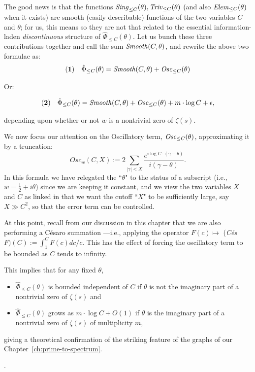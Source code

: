 \documentclass[openany]{book}
\theoremstyle{plain}
\theoremstyle{definition}
\begin{document}
{{{                     The good news is that  the functions ${\it Sing}_{\le C}(\theta),  {\it Triv}_{\le C}(\theta)$ (and also ${\it Elem}_{\le C}(\theta)$ when it exists) are smooth (easily describable) functions of the two variables $C$ and $\theta$; for us, this means so they are not that related to the essential information-laden {\it discontinuous} structure of  $ {\hat \Phi}_{\le C}(\theta)$. Let us bunch these three contributions together and call the sum ${\it Smooth}(C,\theta)$, and rewrite the above two formulae as:
                       $$ {\bf(1)}\ \ \ {\hat \Phi}_{\le C}(\theta) ={\it Smooth}(C,\theta) +  {\it Osc}_{\le C}(\theta) $$

           Or:

           $${\bf(2)}\ \ \ {\hat \Phi}_{\le C}(\theta) = {\it Smooth}(C,\theta)+  {\it Osc}_{\le C}(\theta) +  m\cdot \log C +\epsilon,$$

           depending upon whether or not $w$ is a nontrivial zero of $\zeta(s)$.


 We now focus our attention on the Oscillatory term,  ${\it Osc}_{\le C}(\theta) $, approximating it by a truncation:  $$Osc_w(C,X):=  2\sum_{|\gamma| <
 X} {{\frac{e^{i\log C\cdot (\gamma-\theta)}}{i(\gamma-\theta)}}}.$$ In this formula we have relegated the ``$\theta$" to the status of  a subscript (i.e., $w = {\frac{1}{2}} +i\theta$) since we are keeping it constant, and we view the two variables $X$ and $C$ as linked in that we want the cutoff ``$X$" to be sufficiently large, say $X \gg C^2$, so that the error term can be controlled.

 At this point, recall  from our discussion in  this chapter that we are also performing a C{\'e}saro summation ---i.e.,  applying the operator $F(c) \mapsto$ ({\it C{\'e}s}$F)(C):= \int_1^CF(c) dc/c.$
This has the effect of forcing the oscillatory term to be bounded as $C$ tends to infinity.

 This implies that for any fixed $\theta$,  \begin{itemize} \item ${\hat \Phi}_{\le C}(\theta)$  is bounded independent of $C$  if  $\theta$ is not the imaginary part of a nontrivial zero of $\zeta(s)$  and
 \item ${\hat \Phi}_{\le C}(\theta)$ grows as $m\cdot \log C +O(1)$ if $\theta$ is the imaginary part of a nontrivial zero of $\zeta(s)$ of multiplicity $m$, \end{itemize} giving a theoretical confirmation of the striking feature of the graphs of our Chapter~\ref{ch:prime-to-spectrum}.}.


}}
\end{document}

